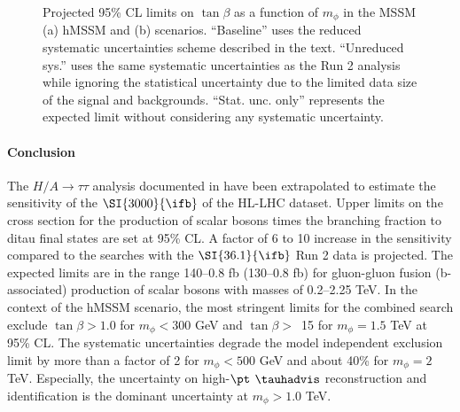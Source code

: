 \begin{figure}[!ht]
    \centering
        \qquad
        \caption{Projected 95\% CL limits on $\tan\beta$ as a function of $m_\phi$ in the MSSM (a) hMSSM and 
        (b) \mhmodp scenarios. ``Baseline'' uses the reduced systematic uncertainties scheme described in the text.
        ``Unreduced sys.'' uses the same systematic uncertainties as the Run 2 analysis while ignoring 
        the statistical uncertainty due to the limited data size of the signal and backgrounds. 
        ``Stat. unc. only'' represents the expected limit without considering any systematic uncertainty.}
    \label{fig:model1}
\end{figure}

\FloatBarrier

\paragraph{Conclusion}
\label{sec:conclusion}

The $H/A \to \tau\tau$ analysis documented in \cite{ATLASRun2Ditau} have been extrapolated to estimate 
the sensitivity of the $\SI{3000}{\ifb}$ of the HL-LHC dataset. Upper limits on the cross section for the production of 
scalar bosons times the branching fraction to ditau final states are set at 95\% CL. A factor of 6 to 10 increase in 
the sensitivity compared to the searches with the  $\SI{36.1}{\ifb}$ Run 2 data \cite{ATLASRun2Ditau} is projected. 
The expected limits are in the range 140--0.8 fb (130--0.8 fb) for gluon-gluon fusion (b-associated) production of scalar 
bosons with masses of 0.2--2.25 TeV. In the context of the hMSSM scenario, the most stringent limits 
for the combined search exclude $\tan\beta > 1.0$ for $m_\phi < 300$ GeV and $\tan\beta >$~15 for $m_\phi = 1.5$ TeV 
at 95\% CL. The systematic uncertainties degrade the model independent exclusion limit by more than a factor of 2 
for $m_\phi<500$ GeV and about 40\% for  $m_\phi=2$ TeV. Especially, the uncertainty on high-$\pt$ $\tauhadvis$
reconstruction and identification is the dominant uncertainty at $m_\phi>1.0$ TeV. 